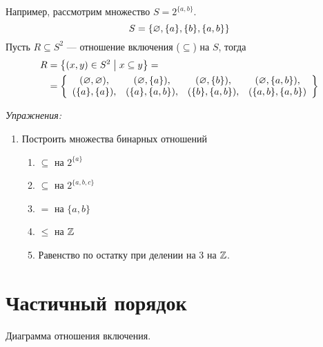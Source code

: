 Например, рассмотрим множество $S=2^{\{a,b\}}$.
\[
  S=\{\varnothing,\{a\},\{b\},\{a,b\}\}
\]
Пусть $R\subseteq S^{2}$ --- отношение включения ($\subseteq$) на $S$, тогда
\[
  \begin{aligned}
    R
     & =\left\{(x,y)\in S^{2}\;\big|\; x\subseteq y\right\}= \\
     & =\left\{
    \begin{array}{cccc}
      (\varnothing,\varnothing), & (\varnothing,\{a\}),   & (\varnothing,\{b\}),   & (\varnothing,\{a,b\}),  \\
      (\{a\},\{a\}), & (\{a\},\{a,b\}), & (\{b\},\{a,b\}), & (\{a,b\},\{a,b\})
    \end{array}\right\}
  \end{aligned}
\]

\vspace{1em}
{\it Упражнения:}
\begin{enumerate}
  \item{}Построить множества бинарных отношений
  \begin{multicols}{2}
    \begin{enumerate}
      \item{}$\subseteq$ на $2^{\{a\}}$
      \item{}$\subseteq$ на $2^{\{a,b,c\}}$
      \item{}$=$ на $\{a,b\}$
      \item{}$\leq$ на $\mathbb Z$
      \item{}Равенство по остатку при делении на 3 на $\mathbb Z$.
    \end{enumerate}
  \end{multicols}
\end{enumerate}

\pagebreak

\section{Частичный порядок}

\begin{marginfigure}[1cm]
  \center

  \caption{Диаграмма отношения включения.}\label{fig:inc_diag}
\end{marginfigure}

